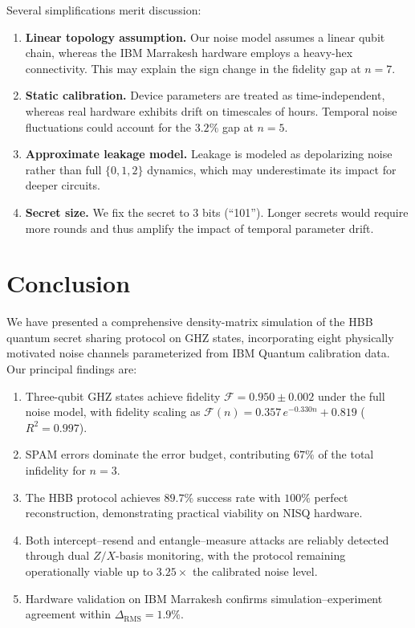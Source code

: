 \documentclass[aip, amsmath, amssymb, preprint, longbibliography]{revtex4-2}
\newcommand{\fid}{\mathcal{F}}
\begin{document}
Several simplifications merit discussion:
\begin{enumerate}
\item \textbf{Linear topology assumption.} Our noise model assumes a
      linear qubit chain, whereas the IBM Marrakesh hardware employs a
      heavy-hex connectivity. This may explain the sign change in the
      fidelity gap at $n=7$.
\item \textbf{Static calibration.} Device parameters are treated as
      time-independent, whereas real hardware exhibits drift on timescales
      of hours. Temporal noise fluctuations could account for the $3.2\%$
      gap at $n=5$.
\item \textbf{Approximate leakage model.} Leakage is modeled as
      depolarizing noise rather than full $\{0,1,2\}$ dynamics, which may
      underestimate its impact for deeper circuits.
\item \textbf{Secret size.} We fix the secret to 3 bits (``101''). Longer
      secrets would require more rounds and thus amplify the impact of
      temporal parameter drift.
\end{enumerate}

\section{Conclusion}\label{sec:conclusion}

We have presented a comprehensive density-matrix simulation of the
HBB quantum secret sharing protocol on GHZ states, incorporating eight
physically motivated noise channels parameterized from IBM Quantum
calibration data. Our principal findings are:

\begin{enumerate}
\item Three-qubit GHZ states achieve fidelity
      $\fid=0.950\pm0.002$ under the full noise model, with fidelity
      scaling as $\fid(n)=0.357\,e^{-0.330n}+0.819$ ($R^2=0.997$).
\item SPAM errors dominate the error budget, contributing $67\%$ of the
      total infidelity for $n=3$.
\item The HBB protocol achieves $89.7\%$ success rate with $100\%$
      perfect reconstruction, demonstrating practical viability on NISQ
      hardware.
\item Both intercept--resend and entangle--measure attacks are reliably
      detected through dual $Z/X$-basis monitoring, with the protocol
      remaining operationally viable up to $3.25\times$ the calibrated
      noise level.
\item Hardware validation on IBM Marrakesh confirms
      simulation--experiment agreement within $\Delta_{\text{RMS}}=1.9\%$.
\end{enumerate}
\end{document}
